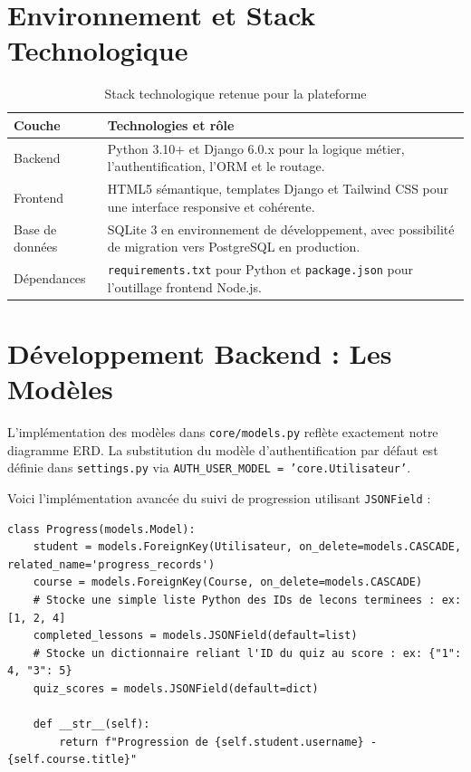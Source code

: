 \documentclass[12pt,a4paper]{report}
\begin{document}
\section{Environnement et Stack Technologique}
\begin{table}[H]
\centering
\caption{Stack technologique retenue pour la plateforme}
\begin{tabular}{@{}p{}p{}@{}}
\toprule
\textbf{Couche} & \textbf{Technologies et rôle} \\
\midrule
Backend & Python 3.10+ et Django 6.0.x pour la logique métier, l'authentification, l'ORM et le routage. \\
Frontend & HTML5 sémantique, templates Django et Tailwind CSS pour une interface responsive et cohérente. \\
Base de données & SQLite 3 en environnement de développement, avec possibilité de migration vers PostgreSQL en production. \\
Dépendances & \texttt{requirements.txt} pour Python et \texttt{package.json} pour l'outillage frontend Node.js. \\
\bottomrule
\end{tabular}
\end{table}

\section{Développement Backend : Les Modèles}

L'implémentation des modèles dans \texttt{core/models.py} reflète exactement notre diagramme ERD. La substitution du modèle d'authentification par défaut est définie dans \texttt{settings.py} via \texttt{AUTH\_USER\_MODEL = 'core.Utilisateur'}.

Voici l'implémentation avancée du suivi de progression utilisant \texttt{JSONField} :

\begin{lstlisting}[caption=Utilisation de JSONField dans le modèle Progress]
class Progress(models.Model):
    student = models.ForeignKey(Utilisateur, on_delete=models.CASCADE, related_name='progress_records')
    course = models.ForeignKey(Course, on_delete=models.CASCADE)
    # Stocke une simple liste Python des IDs de lecons terminees : ex: [1, 2, 4]
    completed_lessons = models.JSONField(default=list) 
    # Stocke un dictionnaire reliant l'ID du quiz au score : ex: {"1": 4, "3": 5}
    quiz_scores = models.JSONField(default=dict) 

    def __str__(self):
        return f"Progression de {self.student.username} - {self.course.title}"
\end{lstlisting}
\end{document}
